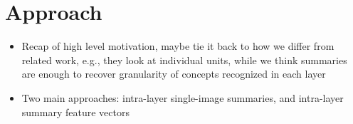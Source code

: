 \section{Approach}

\begin{itemize}
\item Recap of high level motivation, maybe tie it back to how we differ from related work, e.g., they look at individual units, while we think summaries are enough to recover granularity of concepts recognized in each layer
\item Two main approaches: intra-layer single-image summaries, and intra-layer summary feature vectors 
\end{itemize}





